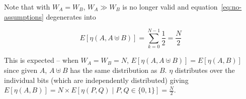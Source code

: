 Note that with $W_A = W_B$, $W_A \gg W_B$ is no longer valid and
equation~\ref{eq:no-assumptions} degenerates into

\begin{equation}
  E[\eta(A, A \uplus B)] = \displaystyle\sum\limits_{k=0}^{N - 1} \frac{1}{2} =
  \frac{N}{2}
\end{equation}

This is expected -- when $W_A = W_B = N$, $E[\eta(A, A \uplus B)] =
E[\eta(A, B)]$ since given $A$, $A \uplus B$ has the same distribution as
$B$.  $\eta$ distributes over the individual bits (which are
independently distributed) giving $E[\eta(A, B)] = N \times E[\eta(P,
  Q) \mid P, Q \in \{0, 1\}] = \frac{N}{2}$.
 
